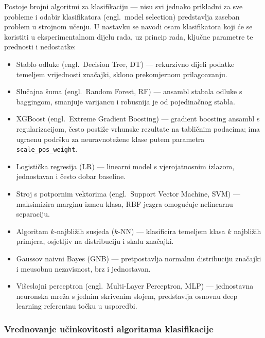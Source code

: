 Postoje brojni algoritmi za klasifikaciju
\cite{duda2000,theodoridis2008} --- nisu svi jednako prikladni za sve
probleme i odabir klasifikatora (engl.\ model selection) predstavlja
zaseban problem u strojnom u\v{c}enju. U nastavku se navodi osam
klasifikatora koji \'{c}e se koristiti u eksperimentalnom dijelu
rada, uz princip rada, klju\v{c}ne parametre te prednosti i nedostatke:

\begin{itemize}
    \item Stablo odluke (engl.\ Decision Tree, DT) --- rekurzivno dijeli
    podatke temeljem vrijednosti zna\v{c}ajki, sklono prekomjernom
    prilago\dj{}avanju.
    \item Slu\v{c}ajna \v{s}uma (engl.\ Random Forest, RF) --- ansambl
    stabala odluke s baggingom, smanjuje varijancu i robusnija je od
    pojedina\v{c}nog stabla.
    \item XGBoost (engl.\ Extreme Gradient Boosting) --- gradient boosting
    ansambl s regularizacijom, \v{c}esto posti\v{z}e vrhunske rezultate
    na tabli\v{c}nim podacima; ima ugra\dj{}enu podr\v{s}ku za
    neuravnote\v{z}ene klase putem parametra \texttt{scale\_pos\_weight}.
    \item Logisti\v{c}ka regresija (LR) --- linearni model s vjerojatnosnim
    izlazom, jednostavan i \v{c}esto dobar baseline.
    \item Stroj s potpornim vektorima (engl.\ Support Vector Machine, SVM)
    --- maksimizira marginu izme\dj{}u klasa, RBF jezgra omogu\'{c}uje
    nelinearnu separaciju.
    \item Algoritam $k$-najbli\v{z}ih susjeda ($k$-NN) --- klasificira
    temeljem klasa $k$ najbli\v{z}ih primjera, osjetljiv na distribuciju
    i skalu zna\v{c}ajki.
    \item Gaussov naivni Bayes (GNB) --- pretpostavlja normalnu distribuciju
    zna\v{c}ajki i me\dj{}usobnu nezavisnost, brz i jednostavan.
    \item Vi\v{s}eslojni perceptron (engl.\ Multi-Layer Perceptron, MLP)
    --- jednostavna neuronska mre\v{z}a s jednim skrivenim slojem,
    predstavlja osnovnu deep learning referentnu to\v{c}ku u usporedbi.
\end{itemize}

\subsubsection{Vrednovanje u\v{c}inkovitosti algoritama klasifikacije}

